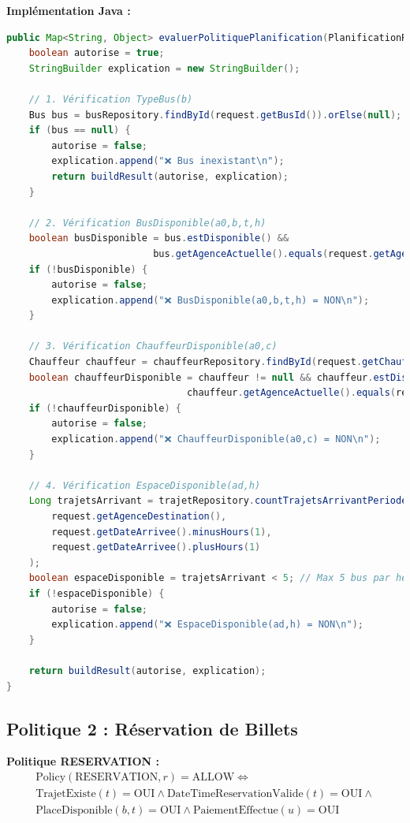 \documentclass[12pt,a4paper]{article}
\begin{document}
    \begin{codebox}
        \textbf{Implémentation Java :}
        \begin{lstlisting}[language=Java]
public Map<String, Object> evaluerPolitiquePlanification(PlanificationRequest request) {
    boolean autorise = true;
    StringBuilder explication = new StringBuilder();

    // 1. Vérification TypeBus(b)
    Bus bus = busRepository.findById(request.getBusId()).orElse(null);
    if (bus == null) {
        autorise = false;
        explication.append("❌ Bus inexistant\n");
        return buildResult(autorise, explication);
    }

    // 2. Vérification BusDisponible(a0,b,t,h)
    boolean busDisponible = bus.estDisponible() &&
                          bus.getAgenceActuelle().equals(request.getAgenceOrigine());
    if (!busDisponible) {
        autorise = false;
        explication.append("❌ BusDisponible(a0,b,t,h) = NON\n");
    }

    // 3. Vérification ChauffeurDisponible(a0,c)
    Chauffeur chauffeur = chauffeurRepository.findById(request.getChauffeurId()).orElse(null);
    boolean chauffeurDisponible = chauffeur != null && chauffeur.estDisponible() &&
                                chauffeur.getAgenceActuelle().equals(request.getAgenceOrigine());
    if (!chauffeurDisponible) {
        autorise = false;
        explication.append("❌ ChauffeurDisponible(a0,c) = NON\n");
    }

    // 4. Vérification EspaceDisponible(ad,h)
    Long trajetsArrivant = trajetRepository.countTrajetsArrivantPeriode(
        request.getAgenceDestination(),
        request.getDateArrivee().minusHours(1),
        request.getDateArrivee().plusHours(1)
    );
    boolean espaceDisponible = trajetsArrivant < 5; // Max 5 bus par heure
    if (!espaceDisponible) {
        autorise = false;
        explication.append("❌ EspaceDisponible(ad,h) = NON\n");
    }

    return buildResult(autorise, explication);
}
        \end{lstlisting}
    \end{codebox}

    \subsection{Politique 2 : Réservation de Billets}

    \begin{definitionbox}
        \textbf{Politique RESERVATION :}
        \begin{multline}
            \text{Policy}(\text{RESERVATION}, r) = \text{ALLOW} \Leftrightarrow \\
            \text{TrajetExiste}(t) = \text{OUI} \wedge \text{DateTimeReservationValide}(t) = \text{OUI} \wedge \\
            \text{PlaceDisponible}(b, t) = \text{OUI} \wedge \text{PaiementEffectue}(u) = \text{OUI}
        \end{multline}
    \end{definitionbox}
\end{document}
